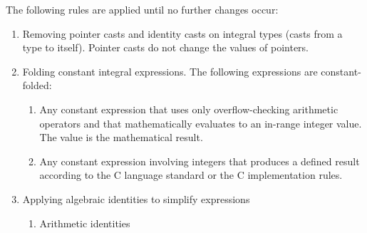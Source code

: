 The following rules are applied until no further changes occur:

\begin{enumerate}
\item
  Removing pointer casts and identity casts on integral types (casts
  from a type to itself). Pointer casts do not change the values of
  pointers.
\item
  Folding constant integral expressions. The following expressions are
  constant-folded:

  \begin{enumerate}
  \item
    Any constant expression that uses only overflow-checking arithmetic
    operators and that mathematically evaluates to an in-range integer
    value. The value is the mathematical result.
  \item
    Any constant expression involving integers that produces a defined
    result according to the C language standard or the C implementation
    rules.
  \end{enumerate}
\item
  Applying algebraic identities to simplify expressions

  \begin{enumerate}
  \item
    Arithmetic identities


\end{enumerate}
\end{enumerate}
